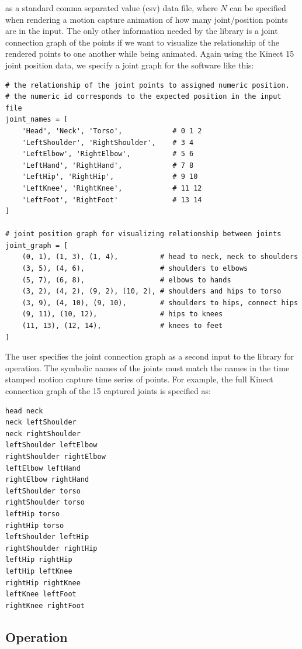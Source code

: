 \documentclass[10pt,a4paper]{article}
\begin{document}
as a standard comma separated value (csv) data file, where $N$ can be
specified when rendering a motion capture animation of how many
joint/position points are in the input.  The only other information
needed by the library is a joint connection graph of the points if we
want to visualize the relationship of the rendered points to one
another while being animated.  Again using the Kinect 15 joint
position data, we specify a joint graph for the software like this:

\begin{verbatim}
# the relationship of the joint points to assigned numeric position.
# the numeric id corresponds to the expected position in the input file
joint_names = [
    'Head', 'Neck', 'Torso',            # 0 1 2
    'LeftShoulder', 'RightShoulder',    # 3 4
    'LeftElbow', 'RightElbow',          # 5 6
    'LeftHand', 'RightHand',            # 7 8
    'LeftHip', 'RightHip',              # 9 10
    'LeftKnee', 'RightKnee',            # 11 12
    'LeftFoot', 'RightFoot'             # 13 14
]

# joint position graph for visualizing relationship between joints
joint_graph = [
    (0, 1), (1, 3), (1, 4),          # head to neck, neck to shoulders
    (3, 5), (4, 6),                  # shoulders to elbows
    (5, 7), (6, 8),                  # elbows to hands
    (3, 2), (4, 2), (9, 2), (10, 2), # shoulders and hips to torso
    (3, 9), (4, 10), (9, 10),        # shoulders to hips, connect hips
    (9, 11), (10, 12),               # hips to knees
    (11, 13), (12, 14),              # knees to feet
]
\end{verbatim}

The user specifies the joint connection graph as a second input to the
library for operation.  The symbolic names of the joints must match the
names in the time stamped motion capture time series of points.
For example, the full Kinect connection graph of the 15 captured
joints is specified as:

\begin{verbatim}
head neck
neck leftShoulder
neck rightShoulder
leftShoulder leftElbow
rightShoulder rightElbow
leftElbow leftHand
rightElbow rightHand
leftShoulder torso
rightShoulder torso
leftHip torso
rightHip torso
leftShoulder leftHip
rightShoulder rightHip
leftHip rightHip
leftHip leftKnee
rightHip rightKnee
leftKnee leftFoot
rightKnee rightFoot
\end{verbatim}

\subsection*{Operation}
\end{document}
